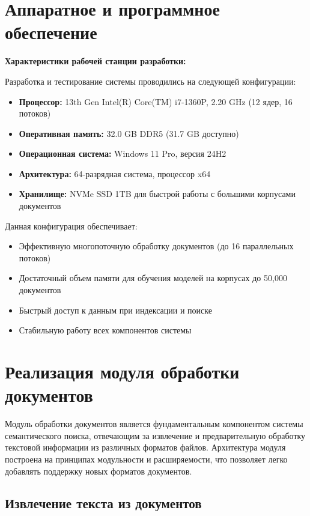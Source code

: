 \section{Аппаратное и программное обеспечение}

\textbf{Характеристики рабочей станции разработки:}

Разработка и тестирование системы проводились на следующей конфигурации:
\begin{itemize}
	\item \textbf{Процессор:} 13th Gen Intel(R) Core(TM) i7-1360P, 2.20 GHz (12 ядер, 16 потоков)
	\item \textbf{Оперативная память:} 32.0 GB DDR5 (31.7 GB доступно)
	\item \textbf{Операционная система:} Windows 11 Pro, версия 24H2
	\item \textbf{Архитектура:} 64-разрядная система, процессор x64
	\item \textbf{Хранилище:} NVMe SSD 1TB для быстрой работы с большими корпусами документов
\end{itemize}

Данная конфигурация обеспечивает:
\begin{itemize}
	\item Эффективную многопоточную обработку документов (до 16 параллельных потоков)
	\item Достаточный объем памяти для обучения моделей на корпусах до 50,000 документов
	\item Быстрый доступ к данным при индексации и поиске
	\item Стабильную работу всех компонентов системы
\end{itemize}





\section{Реализация модуля обработки документов}

Модуль обработки документов является фундаментальным компонентом системы семантического поиска, отвечающим за извлечение и предварительную обработку текстовой информации из различных форматов файлов. Архитектура модуля построена на принципах модульности и расширяемости, что позволяет легко добавлять поддержку новых форматов документов.

\subsection{Извлечение текста из документов}

